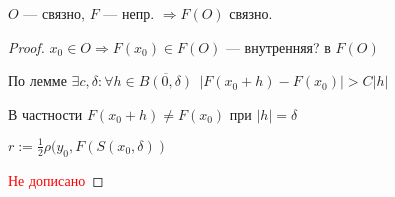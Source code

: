 \begin{remark}
    $O$ --- связно, $F$ --- непр. $\Rightarrow F(O)$ связно.
\end{remark}

\begin{proof}
    $x_0 \in O \Rightarrow F(x_0)\in F(O)$ --- внутренняя? в $F(O)$

    По лемме $\exists c, \delta : \forall h \in \overline{B(0, \delta)} \ \ |F(x_0+h) - F(x_0)| > C|h|$

    В частности $F(x_0 + h)\not=F(x_0)$ при $|h| = \delta$

    $r := \frac{1}{2}\rho(y_0, F(S(x_0, \delta))$

    \textcolor{red}{Не дописано}

\end{proof}

